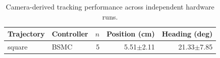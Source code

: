 \begin{table}[!t]
\centering
\caption{Camera-derived tracking performance across independent hardware runs.}
\label{tab:tracking}
\begin{tabular}{llrrr}
\hline
Trajectory & Controller & $n$ & Position (cm) & Heading (deg) \\
\hline
square & BSMC & 5 & 5.51$\pm$2.11 & 21.33$\pm$7.85 \\
\hline
\end{tabular}
\end{table}

